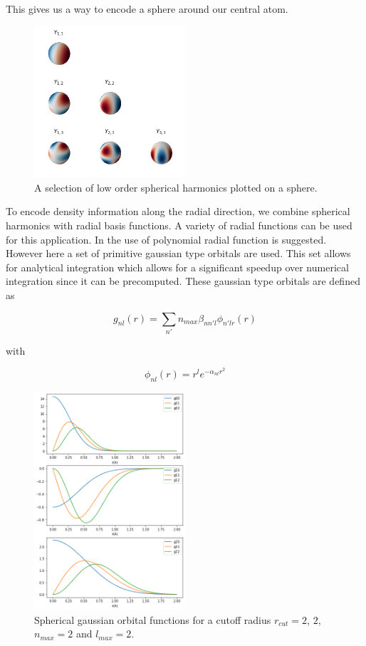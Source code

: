 This gives us a way to encode a sphere around our central atom. 

\begin{figure} [h]
  \centering
  \includegraphics[width=0.5\textwidth]{figures/snap/sph-harm.png} %
  \caption{A selection of low order spherical harmonics plotted on a sphere. } %
  \label{fig:sphharm}
\end{figure}

To encode density information along the radial direction, we combine spherical harmonics with radial basis functions.
A variety of radial functions can be used for this application.
In \cite{KUHL1982236} the use of polynomial radial function is suggested.
However here a set of primitive gaussian type orbitals are used.
This set allows for analytical integration which allows for a significant speedup over numerical integration since it can be precomputed.  
These gaussian type orbitals are defined as

$$g_{nl}(r) = \sum_{n'}{n_{max}} \beta_{nn'l} \phi_{n'lr}(r) $$

with 

$$\phi_{nl}(r) = r^l e^{-\alpha_{nl}r^2} $$ %


\begin{figure} [h]
  \centering
  \includegraphics[width=0.5\textwidth]{figures/snap/gaus_orb.png} %
  \caption{Spherical gaussian orbital functions for a cutoff radius $r_{cut}=2$, $2$, $n_{max}=2$ and $l_{max}=2$. }
  \label{fig:gaussians}
\end{figure}


